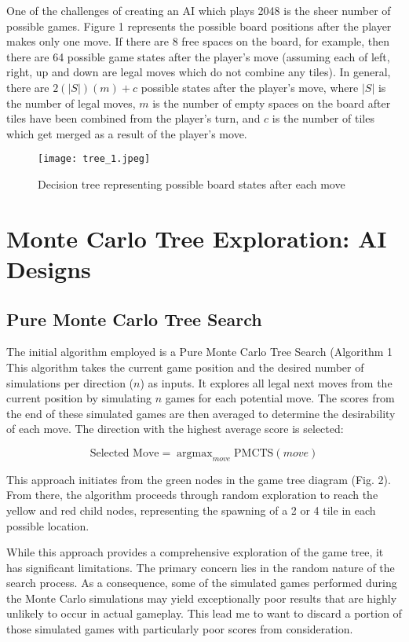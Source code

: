 \documentclass{article}
\DeclareMathOperator*{\argmax}{argmax}
\begin{document}
One of the challenges of creating an AI which plays 2048 is the sheer number of possible games.  Figure 1 represents the possible board positions after the player makes only one move.  If there are 8 free spaces on the board, for example, then there are 64 possible game states after the player's move (assuming each of left, right, up and down are legal moves which do not combine any tiles).  In general, there are $2(|S|)(m) + c$ possible states after the player's move, where $|S|$ is the number of legal moves,  $m$ is the number of empty spaces on the board after tiles have been combined from the player's turn, and $c$ is the number of tiles which get merged as a result of the player's move.

\begin{figure}[H]
\centering
\texttt{[image: tree\_1.jpeg]}
\caption{Decision tree representing possible board states after each move}
\label{fig:tree1}
\end{figure}

\section{Monte Carlo Tree Exploration: AI Designs}
\subsection{Pure Monte Carlo Tree Search}
The initial algorithm employed is a Pure Monte Carlo Tree Search (Algorithm 1 This algorithm takes the current game position and the desired number of simulations per direction ($n$) as inputs. It explores all legal next moves from the current position by simulating $n$ games for each potential move. The scores from the end of these simulated games are then averaged to determine the desirability of each move. The direction with the highest average score is selected: 

\begin{equation}
\label{PMCTS_move_selection}
  \textrm{Selected Move} = \argmax_{move} \text{PMCTS}(move)
\end{equation}


This approach initiates from the green nodes in the game tree diagram (Fig. 2). From there, the algorithm proceeds through random exploration to reach the yellow and red child nodes, representing the spawning of a 2 or 4 tile in each possible location.

While this approach provides a comprehensive exploration of the game tree, it has significant limitations. The primary concern lies in the random nature of the search process. As a consequence, some of the simulated games performed during the Monte Carlo simulations may yield exceptionally poor results that are highly unlikely to occur in actual gameplay.  This lead me to want to discard a portion of those simulated games with particularly poor scores from consideration.
\end{document}
